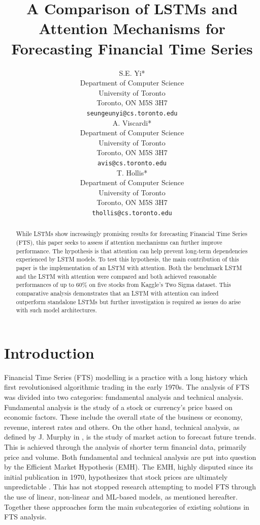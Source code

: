 \documentclass{article}
\title{A Comparison of LSTMs and Attention Mechanisms for Forecasting Financial Time Series}
\author{
    S.E. Yi* \\
    Department of Computer Science\\
    University of Toronto\\
    Toronto, ON M5S 3H7 \\
    \texttt{seungeunyi@cs.toronto.edu} \\
    \And
    A. Viscardi* \\
    Department of Computer Science\\
    University of Toronto\\
    Toronto, ON M5S 3H7 \\
    \texttt{avis@cs.toronto.edu} \\
    \And
    T. Hollis* \\
    Department of Computer Science\\
    University of Toronto\\
    Toronto, ON M5S 3H7 \\
    \texttt{thollis@cs.toronto.edu} \\
}
\begin{document}
\maketitle

\begin{abstract}

  While LSTMs show increasingly promising results for forecasting Financial Time Series (FTS), this paper seeks to assess if attention mechanisms can further improve performance. The hypothesis is that attention can help prevent long-term dependencies experienced by LSTM models. To test this hypothesis, the main contribution of this paper is the implementation of an LSTM with attention. Both the benchmark LSTM and the LSTM with attention were compared and both achieved reasonable performances of up to 60\% on five stocks from Kaggle's Two Sigma dataset. This comparative analysis demonstrates that an LSTM with attention can indeed outperform standalone LSTMs but further investigation is required as issues do arise with such model architectures.  
  
\end{abstract}

\thispagestyle{equalc}

\section{Introduction}

Financial Time Series (FTS) modelling is a practice with a long history which first revolutionised algorithmic trading in the early 1970s. The analysis of FTS was divided into two categories: fundamental analysis and technical analysis. Fundamental analysis is the study of a stock or currency’s price based on economic factors. These include the overall state of the business or economy, revenue, interest rates and others. On the other hand, technical analysis, as defined by J. Murphy in \cite{murphy1999technical}, is the study of market action to forecast future trends. This is achieved through the analysis of shorter term financial data, primarily price and volume. Both fundamental and technical analysis are put into question by the Efficient Market Hypothesis (EMH). The EMH, highly disputed since its initial publication in 1970, hypothesizes that stock prices are ultimately unpredictable \cite{malkiel1970efficient}. This has not stopped research attempting to model FTS through the use of linear, non-linear and ML-based models, as mentioned hereafter. Together these approaches form the main subcategories of existing solutions in FTS analysis. 
\end{document}
